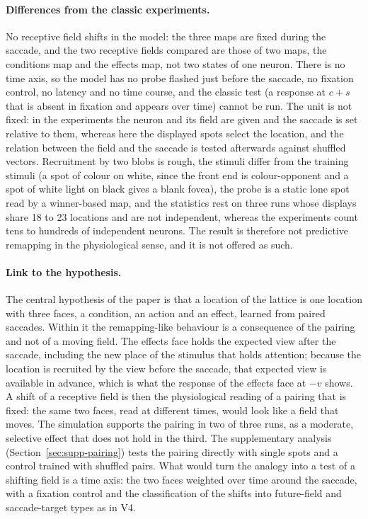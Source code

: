 \documentclass[14pt]{article}
\begin{document}
\paragraph{Differences from the classic experiments.}
No receptive field shifts in the model: the three maps are fixed during the saccade, and the two receptive fields compared are those of two maps, the conditions map and the effects map, not two states of one neuron.
There is no time axis, so the model has no probe flashed just before the saccade, no fixation control, no latency and no time course, and the classic test (a response at $c+s$ that is absent in fixation and appears over time) cannot be run.
The unit is not fixed: in the experiments the neuron and its field are given and the saccade is set relative to them, whereas here the displayed spots select the location, and the relation between the field and the saccade is tested afterwards against shuffled vectors.
Recruitment by two blobs is rough, the stimuli differ from the training stimuli (a spot of colour on white, since the front end is colour-opponent and a spot of white light on black gives a blank fovea), the probe is a static lone spot read by a winner-based map, and the statistics rest on three runs whose displays share 18 to 23 locations and are not independent, whereas the experiments count tens to hundreds of independent neurons.
The result is therefore not predictive remapping in the physiological sense, and it is not offered as such.

\paragraph{Link to the hypothesis.}
The central hypothesis of the paper is that a location of the lattice is one location with three faces, a condition, an action and an effect, learned from paired saccades.
Within it the remapping-like behaviour is a consequence of the pairing and not of a moving field.
The effects face holds the expected view after the saccade, including the new place of the stimulus that holds attention; because the location is recruited by the view before the saccade, that expected view is available in advance, which is what the response of the effects face at $-v$ shows.
A shift of a receptive field is then the physiological reading of a pairing that is fixed: the same two faces, read at different times, would look like a field that moves.
The simulation supports the pairing in two of three runs, as a moderate, selective effect that does not hold in the third.
The supplementary analysis (Section~\ref{sec:supp-pairing}) tests the pairing directly with single spots and a control trained with shuffled pairs.
What would turn the analogy into a test of a shifting field is a time axis: the two faces weighted over time around the saccade, with a fixation control and the classification of the shifts into future-field and saccade-target types as in V4.
\end{document}
